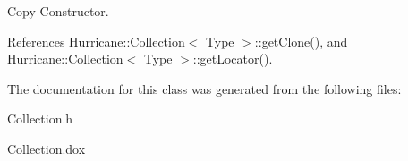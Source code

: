 Copy Constructor. 

References Hurricane\+::\+Collection$<$ Type $>$\+::get\+Clone(), and Hurricane\+::\+Collection$<$ Type $>$\+::get\+Locator().



The documentation for this class was generated from the following files\+:\begin{DoxyCompactItemize}
\item 
Collection.\+h\item 
Collection.\+dox\end{DoxyCompactItemize}
